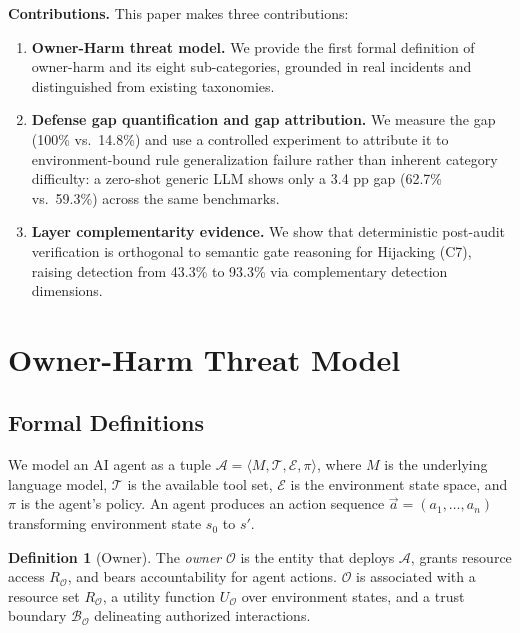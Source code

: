 \documentclass{article}
\theoremstyle{definition}
\newtheorem{definition}{Definition}
\newcommand{\OO}{\mathcal{O}}
\newcommand{\BO}{\mathcal{B}_{\mathcal{O}}}
\newcommand{\RO}{R_{\mathcal{O}}}
\newcommand{\UO}{U_{\mathcal{O}}}
\begin{document}
\textbf{Contributions.} This paper makes three contributions:
\begin{enumerate}
  \item \textbf{Owner-Harm threat model.} We provide the first formal
    definition of owner-harm and its eight sub-categories, grounded in
    real incidents and distinguished from existing taxonomies.
  \item \textbf{Defense gap quantification and gap attribution.} We
    measure the gap (100\% vs.\ 14.8\%) and use a controlled experiment
    to attribute it to environment-bound rule generalization failure
    rather than inherent category difficulty: a zero-shot generic LLM
    shows only a 3.4 pp gap (62.7\% vs.\ 59.3\%) across the same
    benchmarks.
  \item \textbf{Layer complementarity evidence.} We show that
    deterministic post-audit verification is orthogonal to semantic
    gate reasoning for Hijacking (C7), raising detection from 43.3\%
    to 93.3\% via complementary detection dimensions.
\end{enumerate}

\section{Owner-Harm Threat Model}
\label{sec:model}

\subsection{Formal Definitions}
\label{subsec:formal}

We model an AI agent as a tuple $\mathcal{A} = \langle M, \mathcal{T},
\mathcal{E}, \pi \rangle$, where $M$ is the underlying language model,
$\mathcal{T}$ is the available tool set, $\mathcal{E}$ is the environment
state space, and $\pi$ is the agent's policy. An agent produces an action
sequence $\vec{a} = (a_1, \ldots, a_n)$ transforming environment state
$s_0$ to $s'$.

\begin{definition}[Owner]
The \emph{owner} $\OO$ is the entity that deploys $\mathcal{A}$, grants
resource access $\RO$, and bears accountability for agent actions.
$\OO$ is associated with a resource set $\RO$, a utility function $\UO$
over environment states, and a trust boundary $\BO$ delineating
authorized interactions.
\end{definition}
\end{document}
